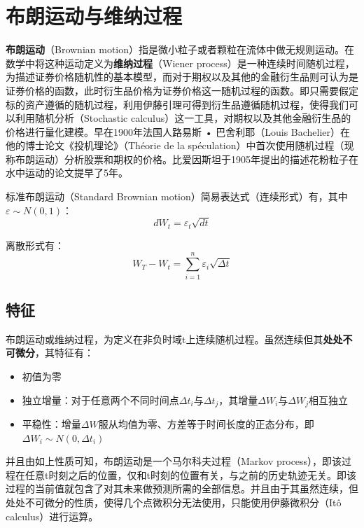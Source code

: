 \documentclass[11pt]{article}
\begin{document}
\maketitle
\tableofcontents

\section{布朗运动与维纳过程}

\textbf{布朗运动}（Brownian motion）指是微小粒子或者颗粒在流体中做无规则运动。在数学中将这种运动定义为\textbf{维纳过程}（Wiener process）是一种连续时间随机过程，为描述证券价格随机性的基本模型，而对于期权以及其他的金融衍生品则可认为是证券价格的函数，此时衍生品价格为证券价格这一随机过程的函数。即只需要假定标的资产遵循的随机过程，利用伊藤引理可得到衍生品遵循随机过程，使得我们可以利用随机分析（Stochastic calculus）这一工具，对期权以及其他金融衍生品的价格进行量化建模。早在1900年法国人路易斯 • 巴舍利耶（Louis Bachelier）在他的博士论文《投机理论》（Théorie de la spéculation）中首次使用随机过程（现称布朗运动）分析股票和期权的价格。比爱因斯坦于1905年提出的描述花粉粒子在水中运动的论文提早了5年。

标准布朗运动（Standard Brownian motion）简易表达式（连续形式）有，其中$\varepsilon \sim N(0,1)$：
\begin{equation*}
    dW_t = \varepsilon_t \sqrt{dt}
\end{equation*}

离散形式有：
\begin{equation*}
    W_T - W_t = \sum^n_{i=1} \varepsilon_i \sqrt{\Delta t}
\end{equation*}

\subsection{特征}

布朗运动或维纳过程，为定义在非负时域t上连续随机过程。虽然连续但其\textbf{处处不可微分}，其特征有：
\begin{itemize}
    \item 初值为零
    \item 独立增量：对于任意两个不同时间点$\Delta t_i$与$\Delta t_j$，其增量$\Delta W_i$与$\Delta W_j$相互独立
    \item 平稳性：增量$\Delta W$服从均值为零、方差等于时间长度的正态分布，即$\Delta W_i \sim N(0,\Delta t_i)$
\end{itemize}

并且由如上性质可知，布朗运动是一个马尔科夫过程（Markov process），即该过程在任意t时刻之后的位置，仅和t时刻的位置有关，与之前的历史轨迹无关。即该过程的当前值就包含了对其未来做预测所需的全部信息。并且由于其虽然连续，但处处不可微分的性质，使得几个点微积分无法使用，只能使用伊藤微积分（Itô calculus）进行运算。
\end{document}
